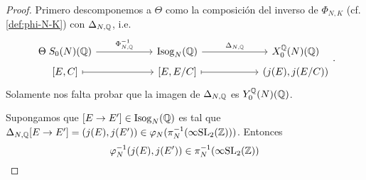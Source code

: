 \begin{proof}

Primero descomponemos a $\Theta$ como la composición del inverso de $\Phi_{N,K}$ (cf. \eqref{def:phi-N-K}) con $\Delta_{N,\mathbb{Q}}$, i.e.
\[
	\begin{tikzcd}[row sep=1mm,column sep=20mm]
		\Theta\; S_0(N)(\QQ) \arrow[r,"\Phi^{-1}_{N,\QQ}"] & \mathrm{Isog}_N(\QQ) \arrow[r,"\Delta_{N,\QQ}"] & X^\QQ_0(N)(\QQ) \\
		\text{[}E,C\text{]} \arrow[r,mapsto] & \text{[}E,E/C\text{]} \arrow[r,mapsto] & (j(E),j(E/C))
	\end{tikzcd}.
\]
Solamente nos falta probar que la imagen de $\Delta_{N,\mathbb{Q}}$ es $Y^{\mathbb{Q}}_0(N)(\mathbb{Q})$.

Supongamos que $[E\rightarrow E']\in\mathrm{Isog}_N(\mathbb{Q})$ es tal que $\Delta_{N,\mathbb{Q}}[E\rightarrow E']=(j(E),j(E'))\in\varphi_N(\pi_N^{-1}(\infty\mathrm{SL}_2(\mathbb{Z})))$. Entonces
\[
	\varphi_N^{-1}(j(E),j(E'))\in\pi_N^{-1}(\infty\mathrm{SL}_2(\mathbb{Z}))
\]
\end{proof}


